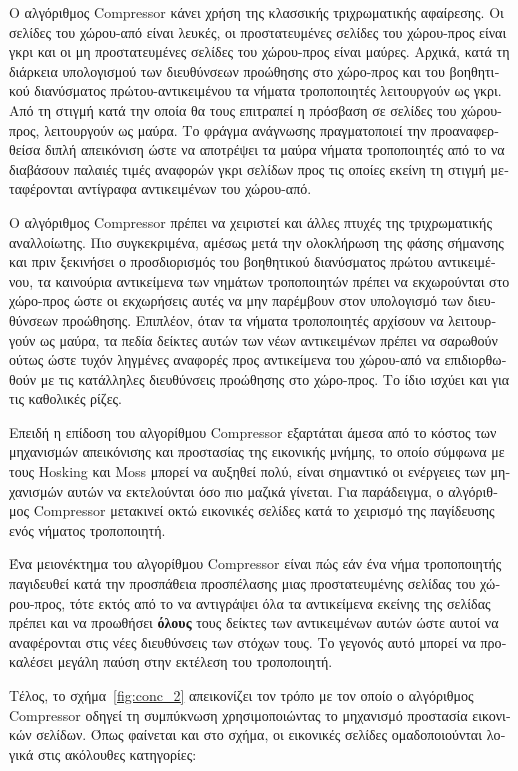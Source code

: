 \begin{greek}
Ο αλγόριθμος Compressor κάνει χρήση της κλασσικής τριχρωματικής
αφαίρεσης. Οι σελίδες του χώρου-από είναι λευκές, οι προστατευμένες
σελίδες του χώρου-προς είναι γκρι και οι μη προστατευμένες σελίδες
του χώρου-προς είναι μαύρες. Αρχικά, κατά τη διάρκεια υπολογισμού
των διευθύνσεων προώθησης στο χώρο-προς και του βοηθητικού διανύσματος
πρώτου-αντικειμένου τα νήματα τροποποιητές λειτουργούν ως γκρι.
Από τη στιγμή κατά την οποία θα τους επιτραπεί η πρόσβαση σε
σελίδες του χώρου-προς, λειτουργούν ως μαύρα. Το φράγμα ανάγνωσης
πραγματοποιεί την προαναφερθείσα διπλή απεικόνιση ώστε να αποτρέψει
τα μαύρα νήματα τροποποιητές από το να διαβάσουν παλαιές τιμές
αναφορών γκρι σελίδων προς τις οποίες εκείνη τη στιγμή μεταφέρονται
αντίγραφα αντικειμένων του χώρου-από.

Ο αλγόριθμος Compressor πρέπει να χειριστεί και άλλες πτυχές
της τριχρωματικής αναλλοίωτης. Πιο συγκεκριμένα, αμέσως μετά
την ολοκλήρωση της φάσης σήμανσης και πριν ξεκινήσει ο
προσδιορισμός του βοηθητικού διανύσματος πρώτου αντικειμένου,
τα καινούρια αντικείμενα των νημάτων τροποποιητών πρέπει
να εκχωρούνται στο χώρο-προς ώστε οι εκχωρήσεις αυτές να
μην παρέμβουν στον υπολογισμό των διευθύνσεων προώθησης.
Επιπλέον, όταν τα νήματα τροποποιητές αρχίσουν να λειτουργούν
ως μαύρα, τα πεδία δείκτες αυτών των νέων αντικειμένων πρέπει
να σαρωθούν ούτως ώστε τυχόν ληγμένες αναφορές προς αντικείμενα
του χώρου-από να επιδιορθωθούν με τις κατάλληλες διευθύνσεις
προώθησης στο χώρο-προς. Το ίδιο ισχύει και για τις καθολικές
ρίζες.

Επειδή η επίδοση του αλγορίθμου Compressor εξαρτάται άμεσα
από το κόστος των μηχανισμών απεικόνισης και προστασίας της
εικονικής μνήμης, το οποίο σύμφωνα με τους Hosking και Moss
\cite{DBLP:conf/sosp/HoskingM93} μπορεί να αυξηθεί πολύ, είναι
σημαντικό οι ενέργειες των μηχανισμών αυτών να εκτελούνται
όσο πιο μαζικά γίνεται. Για παράδειγμα, ο αλγόριθμος Compressor
μετακινεί οκτώ εικονικές σελίδες κατά το χειρισμό της παγίδευσης
ενός νήματος τροποποιητή. 

Ένα μειονέκτημα του αλγορίθμου Compressor είναι πώς εάν ένα
νήμα τροποποιητής παγιδευθεί κατά την προσπάθεια προσπέλασης
μιας προστατευμένης σελίδας του χώρου-προς, τότε εκτός από
το να αντιγράψει όλα τα αντικείμενα εκείνης της σελίδας πρέπει
και να προωθήσει \textbf{όλους} τους δείκτες των αντικειμένων
αυτών ώστε αυτοί να αναφέρονται στις νέες διευθύνσεις των
στόχων τους. Το γεγονός αυτό μπορεί να προκαλέσει μεγάλη
παύση στην εκτέλεση του τροποποιητή.

Τέλος, το σχήμα~\ref{fig:conc_2} απεικονίζει τον τρόπο με τον
οποίο ο αλγόριθμος Compressor οδηγεί τη συμπύκνωση χρησιμοποιώντας
το μηχανισμό προστασία εικονικών σελίδων. Όπως φαίνεται
και στο σχήμα, οι εικονικές σελίδες ομαδοποιούνται λογικά
στις ακόλουθες κατηγορίες:


\end{greek}

